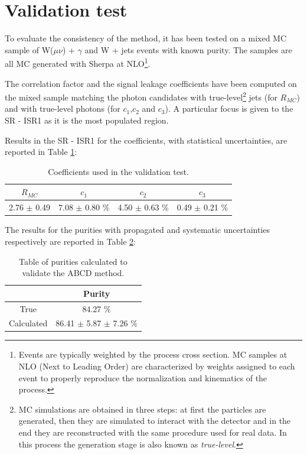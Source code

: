 \documentclass[11pt,a4paper,twoside,openright]{book}
\begin{document}
\section{Validation test}

To evaluate the consistency of the method, it has been tested on a mixed MC sample of W($\mu \nu$) + $\gamma$ and W + jets events with known purity. The samples are all MC generated with Sherpa \cite{Sherpa} at NLO\footnote{Events are typically weighted by the process cross section. MC samples at NLO (Next to Leading Order) are characterized by weights assigned to each event to properly reproduce the normalization and kinematics of the process.}.

The correlation factor and the signal leakage coefficients have been computed on the mixed sample matching the photon candidates with true-level\footnote{MC simulations are obtained in three steps: at first the particles are generated, then they are simulated to interact with the detector and in the end they are reconstructed with the same procedure used for real data. In this process the generation stage is also known as \textit{true-level}.} jets (for $R_{MC}$) and with true-level photons (for $c_{1}$,$c_{2}$ and $c_{3}$). A particular focus is given to the SR - ISR1 as it is the most populated region.

Results in the SR - ISR1 for the coefficients, with statistical uncertainties, are reported in Table \ref{tab:validation_coeff}:

\begin{table}[!htbp]
    \centering
    \begin{tabular}{cccc}
    \toprule
    $R_{MC}$ & $c_{1}$ & $c_{2}$ & $c_{3}$ \\ \midrule
    2.76 $\pm$ 0.49 & 7.08 $\pm$ 0.80 \% & 4.50 $\pm$ 0.63 \% & 0.49 $\pm$ 0.21 \%\\ \bottomrule
    \end{tabular}
    \caption{Coefficients used in the validation test.}
    \label{tab:validation_coeff}
\end{table}{}


The results for the purities with propagated and systematic uncertainties respectively are reported in Table \ref{tab:validation_purities}:

\begin{table}[!htbp]
    \centering
    \begin{tabular}{cc}
    \toprule
     & Purity \\ \midrule
    True & 84.27 \%\\ \midrule
    Calculated & 86.41 $\pm$ 5.87 $\pm$ 7.26 \%\\ \bottomrule
    \end{tabular}
    \caption{Table of purities calculated to validate the ABCD method.}
    \label{tab:validation_purities}
\end{table}{}
\end{document}
